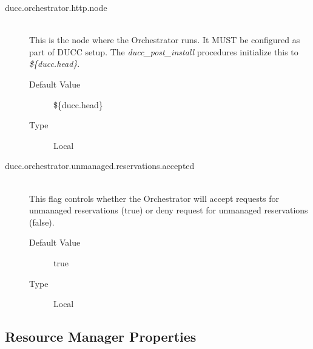 \begin{description}
      \item[ducc.orchestrator.http.node] \hfill \\
        This is the node where the Orchestrator runs. It MUST be configured as part of DUCC 
        setup. The {\em ducc\_post\_install} procedures initialize this to {\em \$\{ducc.head\}}.
        \begin{description}
          \item[Default Value] \$\{ducc.head\}
          \item[Type] Local 
        \end{description}
        
      \item[ducc.orchestrator.unmanaged.reservations.accepted] \hfill \\
        This flag controls whether the Orchestrator will accept requests for
        unmanaged reservations (true) or deny request for unmanaged reservations
        (false).
        \begin{description}
          \item[Default Value] true
          \item[Type] Local 
        \end{description}      
      \end{description}

\subsection{Resource Manager Properties}

